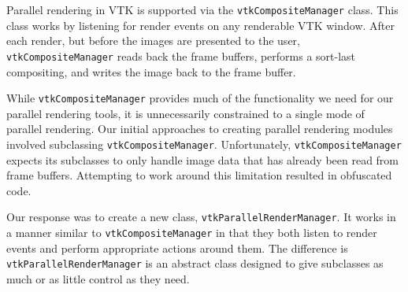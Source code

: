 \documentclass{acmsiggraph}
\newcommand{\cidentifier}[1]{\texttt{#1}}
\begin{document}
  Parallel rendering in VTK is supported via the
  \cidentifier{vtk\-Composite\-Manager} class.  This class works by
  listening for render events on any renderable VTK window.  After each
  render, but before the images are presented to the user,
  \cidentifier{vtk\-Composite\-Manager} reads back the frame buffers,
  performs a sort-last compositing, and writes the image back to the frame
  buffer.

  While \cidentifier{vtk\-Composite\-Manager} provides much of the
  functionality we need for our parallel rendering tools, it is
  unnecessarily constrained to a single mode of parallel rendering.  Our
  initial approaches to creating parallel rendering modules involved
  subclassing \cidentifier{vtk\-Composite\-Manager}.  Unfortunately,
  \cidentifier{vtk\-Composite\-Manager} expects its subclasses to only
  handle image data that has already been read from frame buffers.
  Attempting to work around this limitation resulted in obfuscated code.

  Our response was to create a new class,
  \cidentifier{vtk\-Parallel\-Render\-Manager}.  It works in a manner
  similar to \cidentifier{vtk\-Composite\-Manager} in that they both listen
  to render events and perform appropriate actions around them.  The
  difference is \cidentifier{vtk\-Parallel\-Render\-Manager} is an abstract
  class designed to give subclasses as much or as little control as they
  need.
\end{document}
